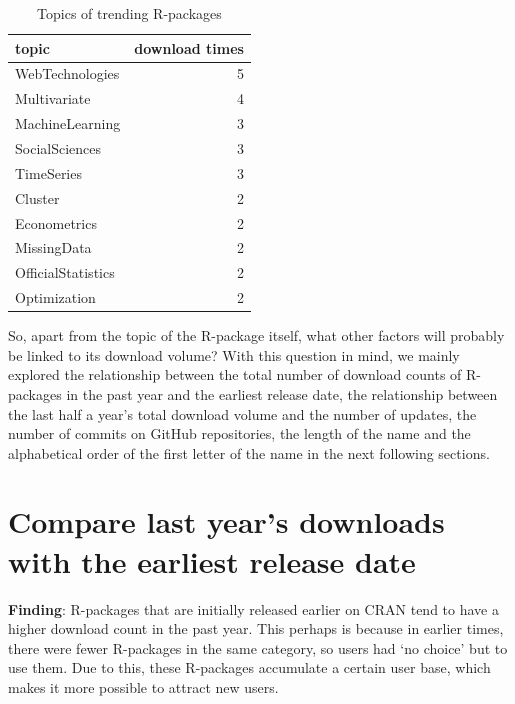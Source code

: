 \documentclass[
]{book}
\newenvironment{discovery}[1]{%
  \begin{tcolorbox}[colback=blue!30,colframe=blue!80!black]#1}{\end{tcolorbox}}
\begin{document}
\begin{table}

\caption{\label{tab:trending-count}Topics of trending R-packages}
\centering
\begin{tabular}[t]{l|r}
\hline
topic & download times\\
\hline
WebTechnologies & 5\\
\hline
Multivariate & 4\\
\hline
MachineLearning & 3\\
\hline
SocialSciences & 3\\
\hline
TimeSeries & 3\\
\hline
Cluster & 2\\
\hline
Econometrics & 2\\
\hline
MissingData & 2\\
\hline
OfficialStatistics & 2\\
\hline
Optimization & 2\\
\hline
\end{tabular}
\end{table}

So, apart from the topic of the R-package itself, what other factors will probably be linked to its download volume? With this question in mind, we mainly explored the relationship between the total number of download counts of R-packages in the past year and the earliest release date, the relationship between the last half a year's total download volume and the number of updates, the number of commits on GitHub repositories, the length of the name and the alphabetical order of the first letter of the name in the next following sections.

\hypertarget{compare-last-years-downloads-with-the-earliest-release-date}{%
\section{Compare last year's downloads with the earliest release date}\label{compare-last-years-downloads-with-the-earliest-release-date}}

\begin{discovery}
\textbf{Finding}: R-packages that are initially released earlier on CRAN
tend to have a higher download count in the past year. This perhaps is
because in earlier times, there were fewer R-packages in the same
category, so users had `no choice' but to use them. Due to this, these
R-packages accumulate a certain user base, which makes it more possible
to attract new users.
\end{discovery}
\end{document}
